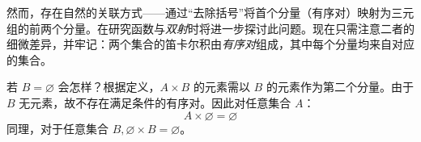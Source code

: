 然而，存在自然的关联方式——通过``去除括号''将首个分量（有序对）映射为三元组的前两个分量。在研究函数与\emph{双射}时将进一步探讨此问题。现在只需注意二者的细微差异，并牢记：两个集合的笛卡尔积由\emph{有序对}组成，其中每个分量均来自对应的集合。

\begin{example}
    若 $B = \varnothing$ 会怎样？根据定义，$A \times B$ 的元素需以 $B$ 的元素作为第二个分量。由于 $B$ 无元素，故不存在满足条件的有序对。因此对任意集合 $A$：
    \[A \times \varnothing = \varnothing\]
    同理，对于任意集合 $B, \varnothing \times B = \varnothing$。
\end{example}
